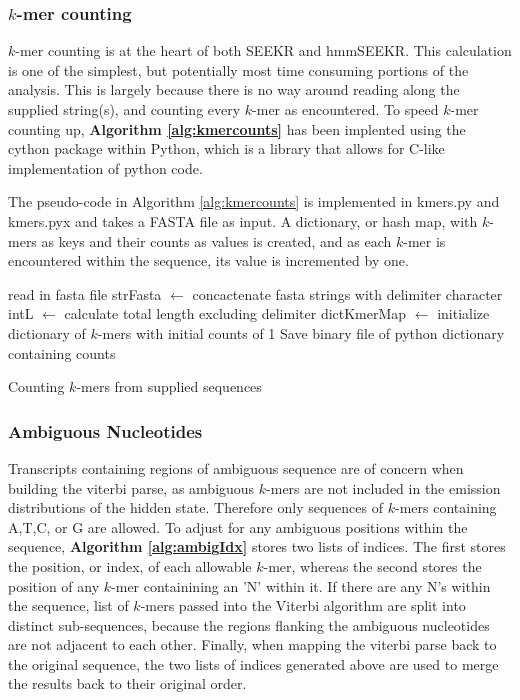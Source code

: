 \subsubsection{$k$-mer counting}
$k$-mer counting is at the heart of both SEEKR and hmmSEEKR. This calculation is one of the simplest, but potentially most time consuming portions of the analysis. This is largely because there is no way around reading along the supplied string(s), and counting every $k$-mer as encountered. To speed $k$-mer counting up, \textbf{Algorithm \ref{alg:kmercounts}} has been implented using the cython package within Python, which is a library that allows for C-like implementation of python code.

The pseudo-code in Algorithm \ref{alg:kmercounts} is implemented in kmers.py and kmers.pyx and takes a FASTA file as input. A dictionary, or hash map, with $k$-mers as keys and their counts as values is created, and as each $k$-mer is encountered within the sequence, its value is incremented by one.

\begin{algorithm}[h]
\DontPrintSemicolon
{}
\SetAlgoLined
{}
 read in fasta file\;
 strFasta $\leftarrow$ concactenate fasta strings with delimiter character\;
 intL $\leftarrow$ calculate total length excluding delimiter\;
 dictKmerMap $\leftarrow$ initialize dictionary of $k$-mers with initial counts of 1\;
 Save binary file of python dictionary containing counts
 \caption{Counting $k$-mers from supplied sequences}
 \label{alg:kmercounts}
\end{algorithm}

\subsubsection{Ambiguous Nucleotides}
Transcripts containing regions of ambiguous sequence are of concern when building the viterbi parse, as ambiguous $k$-mers are not included in the emission distributions of the hidden state. Therefore only sequences of $k$-mers containing A,T,C, or G are allowed. To adjust for any ambiguous positions within the sequence, \textbf{Algorithm \ref{alg:ambigIdx}} stores two lists of indices. The first stores the position, or index, of each allowable $k$-mer, whereas the second stores the position of any $k$-mer containining an 'N' within it. If there are any N's within the sequence, list of $k$-mers passed into the Viterbi algorithm are split into distinct sub-sequences, because the regions flanking the ambiguous nucleotides are not adjacent to each other. Finally, when mapping the viterbi parse back to the original sequence, the two lists of indices generated above are used to merge the results back to their original order.

